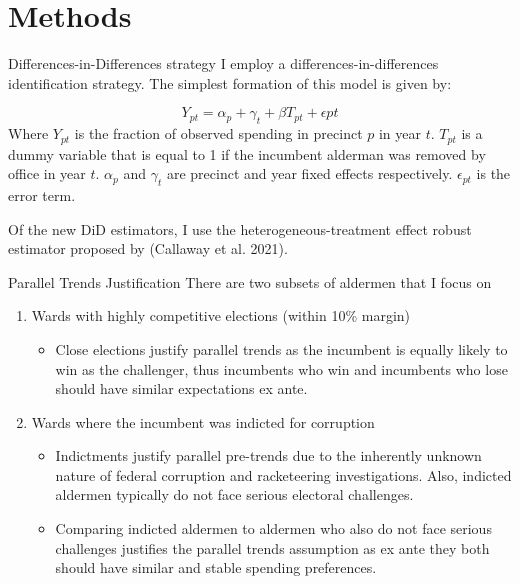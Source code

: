 \section{Methods}
\begin{frame}{Differences-in-Differences strategy}
    I employ a differences-in-differences identification strategy. 
    The simplest formation of this model is given by:

    \begin{equation}\label{eq:standard_did}
        Y_{pt} = \alpha_{p} + \gamma_{t} + \beta T_{pt} + \epsilon{pt}
    \end{equation}
    Where $Y_{pt}$ is the fraction of observed spending in precinct $p$ in year $t$. $T_{pt}$ is a dummy variable that is equal to 1 if the incumbent alderman was removed by office in year $t$. $\alpha_{p}$ and $\gamma_{t}$ are precinct and year fixed effects respectively. $\epsilon_{pt}$ is the error term.

    Of the new DiD estimators, I use the heterogeneous-treatment effect robust estimator proposed by (Callaway et al. 2021).
\end{frame}

\begin{frame}{Parallel Trends Justification}
    There are two subsets of aldermen that I focus on
    \begin{enumerate}
        \item Wards with highly competitive elections (within 10\% margin)
        \begin{itemize}
            \item Close elections justify parallel trends as the incumbent is equally likely to win as the challenger, thus incumbents who win and incumbents who lose should have similar expectations ex ante.
        \end{itemize}
        \item Wards where the incumbent was indicted for corruption
        \begin{itemize}
            \item Indictments justify parallel pre-trends due to the inherently unknown nature of federal corruption and racketeering investigations. Also, indicted aldermen typically do not face serious electoral challenges.
            \item Comparing indicted aldermen to aldermen who also do not face serious challenges justifies the parallel trends assumption as ex ante they both should have similar and stable spending preferences.
        \end{itemize}
    \end{enumerate}
\end{frame}